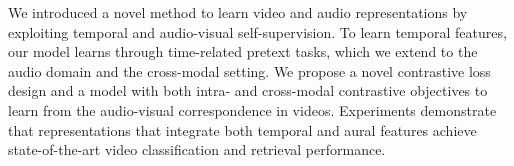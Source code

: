 \documentclass[letterpaper]{article} %
\begin{document}
We introduced a novel method to learn video and audio representations by exploiting temporal and audio-visual self-supervision. 
To learn temporal features, our model learns through time-related pretext tasks, which we extend to the audio domain and the cross-modal setting.
We propose a novel contrastive loss design and a model with both intra- and cross-modal contrastive objectives to learn from the audio-visual correspondence in videos. 
Experiments demonstrate that representations that integrate both temporal and aural features achieve state-of-the-art video classification and retrieval performance. 




\end{document}
